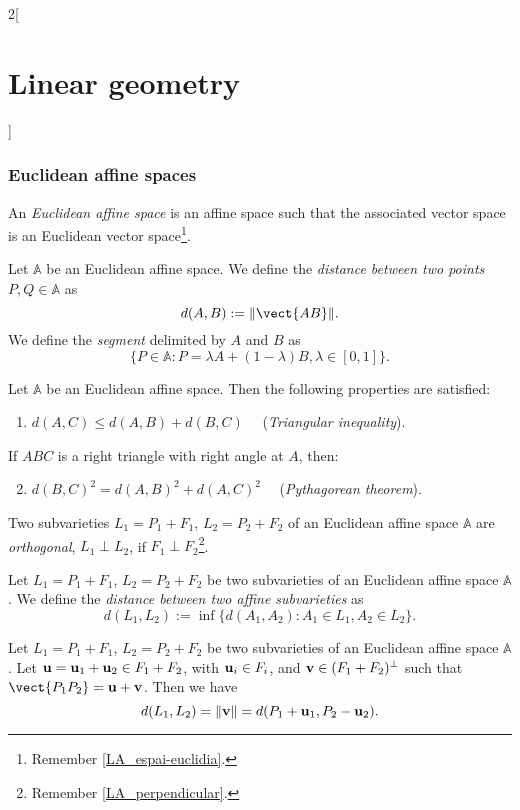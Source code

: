\documentclass[../../../main.tex]{subfiles}
\begin{document}
\begin{multicols}{2}[\section{Linear geometry}]
  \subsubsection{Euclidean affine spaces}
  \begin{definition}
    An \emph{Euclidean affine space} is an affine space such that the associated vector space is an Euclidean vector space\footnote{Remember \cref{LA_espai-euclidia}.}.
  \end{definition}
  \begin{definition}
    Let $\mathbb{A}$ be an Euclidean affine space. We define the \emph{distance between two points} $P,Q\in\mathbb{A}$ as $$d(A,B):=\|\vect{AB}\|.$$ We define the \emph{segment} delimited by $A$ and $B$ as $$\{P\in\mathbb{A}:P=\lambda A+(1-\lambda)B,\lambda\in[0,1]\}.$$
  \end{definition}
  \begin{proposition}
    Let $\mathbb{A}$ be an Euclidean affine space. Then the following properties are satisfied:
    \begin{enumerate}
      \item $d(A,C)\leq d(A,B)+d(B,C)\quad$ (\emph{Triangular inequality}).
    \end{enumerate}
    If $ABC$ is a right triangle with right angle at $A$, then:
    \begin{enumerate}
      \setcounter{enumi}{1}
      \item $d(B,C)^2=d(A,B)^2+d(A,C)^2\quad$ (\emph{Pythagorean theorem}).
    \end{enumerate}
  \end{proposition}
  \begin{definition}
    Two subvarieties $L_1=P_1+F_1$, $L_2=P_2+F_2$ of an Euclidean affine space $\mathbb{A}$ are \emph{orthogonal}, $L_1\perp L_2$, if $F_1\perp F_2$\footnote{Remember \cref{LA_perpendicular}.}.
  \end{definition}
  \begin{definition}
    Let $L_1=P_1+F_1$, $L_2=P_2+F_2$ be two subvarieties of an Euclidean affine space $\mathbb{A}$. We define the \emph{distance between two affine subvarieties} as $$d(L_1,L_2):=\inf\{d(A_1,A_2):A_1\in L_1, A_2\in L_2\}.$$
  \end{definition}
  \begin{theorem}
    Let $L_1=P_1+F_1$, $L_2=P_2+F_2$ be two subvarieties of an Euclidean affine space $\mathbb{A}$. Let $\boldsymbol{\mathrm{u}}=\boldsymbol{\mathrm{u}}_1+\boldsymbol{\mathrm{u}}_2\in F_1+F_2$, with $\boldsymbol{\mathrm{u}}_i\in F_i$, and $\boldsymbol{\mathrm{v}}\in(F_1+F_2)^\perp$ such that $\vect{P_1P_2}=\vf{u}+\vf{v}$. Then we have $$d(L_1,L_2)=\|\boldsymbol{\mathrm{v}}\|=d(P_1+\boldsymbol{\mathrm{u}}_1,P_2-\boldsymbol{\mathrm{u}}_2).$$
  \end{theorem}

\end{multicols}
\end{document}
